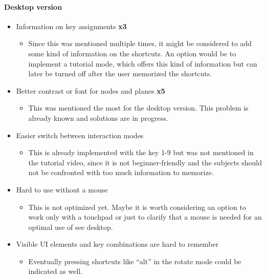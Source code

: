 \paragraph{Desktop version}
\begin{itemize}
  \item Information on key assignments \textbf{x3}
  \begin{itemize}
    \item Since this was mentioned multiple times, it might be considered to add some kind of information on the \glspl{shortcut}. An option would be to implement a tutorial mode, which offers this kind of information but can later be turned off after the user memorized the \glspl{shortcut}.
  \end{itemize}
  \item Better contrast or font for \glspl{node} and \glspl{plane} \textbf{x5}
  \begin{itemize}
    \item This was mentioned the most for the desktop version. This problem is already known and solutions are in progress. 
  \end{itemize}
  \item Easier switch between interaction modes
  \begin{itemize}
    \item This is already implemented with the key 1-9 but was not mentioned in the tutorial video, since it is not beginner-friendly and the subjects should not be confronted with too much information to memorize.
  \end{itemize}
  \item Hard to use without a mouse
  \begin{itemize}
    \item This is not optimized yet. Maybe it is worth considering an option to work only with a touchpad or just to clarify that a mouse is needed for an optimal use of \gls{see} desktop.
  \end{itemize}
  \item Visible UI elements and key combinations are hard to remember
  \begin{itemize}
    \item Eventually pressing \glspl{shortcut} like \enquote{alt} in the rotate mode could be indicated as well. 
  \end{itemize}
\end{itemize} 
